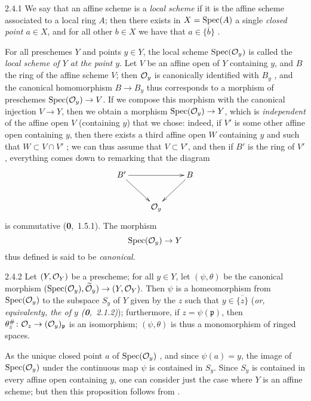 
\begin{env}{2.4.1}
\label{env-1.2.4.1}
We say that an affine scheme is a \emph{local scheme} if
it is the affine scheme associated to a local ring $A$; then there exists in
$X=\operatorname{Spec}(A)$ a single \emph{closed point $a\in X$}, and for all other $b\in X$
we have that $a\in\overline{\{b\}}$ .
\end{env}
    
For all preschemes $Y$ and points $y\in Y$, the local scheme $\operatorname{Spec}(\mathcal{O}_y)$
is called the \emph{local scheme of $Y$ at the point $y$}. Let $V$ be an affine
open of $Y$ containing $y$, and $B$ the ring of the affine scheme $V$; then
$\mathcal{O}_y$ is canonically identified with $B_y$ , and the canonical
homomorphism $B\to B_y$ thus corresponds  to a morphism of preschemes
$\operatorname{Spec}(\mathcal{O}_y)\to V$.  If we compose this morphism with the canonical injection
$V\to Y$, then we obtain a morphism $\operatorname{Spec}(\mathcal{O}_y)\to Y$, which is
\emph{independent} of the affine open $V$ (containing $y$) that we chose:
indeed, if $V'$ is some other affine open containing $y$, then there exists a
third affine open $W$ containing $y$ and such that $W\subset V\cap V'$ ;
we can thus assume that $V\subset V'$, and then if $B'$ is the ring of $V'$,
everything comes down to remarking that the diagram
\[
  \xymatrix{
    B'\ar[rr]\ar[dr] & & B\ar[dl]\\
    & \O_y &
  }
\]
is commutative
(\textbf{0},~1.5.1). The morphism \[ \operatorname{Spec}(\mathcal{O}_y)\to Y \] thus defined is said
to be \emph{canonical}.
    
\begin{env}[Proposition]{2.4.2}
\label{prop-1.2.4.2}
Let $(Y,\mathcal{O}_Y)$ be a prescheme;
for all $y\in Y$, let $(\psi,\theta)$ be the canonical morphism
$(\operatorname{Spec}(\mathcal{O}_y),\widetilde{\mathcal{O}}_y)\to(Y,\mathcal{O}_Y)$. Then $\psi$ is a homeomorphism
from $\operatorname{Spec}(\mathcal{O}_y)$ to the subspace $S_y$ of $Y$ given by the $z$ such that
$y\in\overline{\{z\}}$ (\emph{or, equivalenty, the \completelyunsure of $y$
(\textbf{0},~2.1.2)}); furthermore, if $z=\psi(\mathfrak{p})$, then
$\theta_z^\#\colon\mathcal{O}_z\to(\mathcal{O}_y)_\mathfrak{p}$ is an isomorphism; $(\psi,\theta)$
is thus a monomorphism of ringed spaces.
\end{env}
    
As the unique closed point $a$ of $\operatorname{Spec}(\mathcal{O}_y)$ , and since $\psi(a)=y$, the image of $\operatorname{Spec}(\mathcal{O}_y)$ under
the continuous map $\psi$ is contained in $S_y$. Since $S_y$ is contained in
every affine open containing $y$, one can consider just the case where $Y$ is an
affine scheme; but then this proposition follows from .
    
